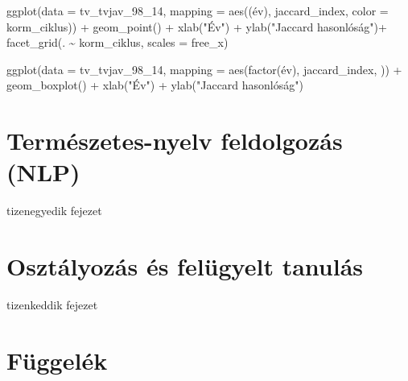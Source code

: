 \documentclass[
]{book}
\newenvironment{Shaded}{\begin{snugshade}}{\end{snugshade}}
\newcommand{\AttributeTok}[1]{\textcolor[rgb]{0.77,0.63,0.00}{#1}}
\newcommand{\FunctionTok}[1]{\textcolor[rgb]{0.00,0.00,0.00}{#1}}
\newcommand{\NormalTok}[1]{#1}
\newcommand{\SpecialCharTok}[1]{\textcolor[rgb]{0.00,0.00,0.00}{#1}}
\newcommand{\StringTok}[1]{\textcolor[rgb]{0.31,0.60,0.02}{#1}}
\begin{document}
\begin{Shaded}
\begin{Highlighting}[]
\FunctionTok{ggplot}\NormalTok{(}\AttributeTok{data =}\NormalTok{ tv\_tvjav\_98\_14, }\AttributeTok{mapping =} \FunctionTok{aes}\NormalTok{((év), jaccard\_index, }\AttributeTok{color =}\NormalTok{ korm\_ciklus)) }\SpecialCharTok{+}
  \FunctionTok{geom\_point}\NormalTok{() }\SpecialCharTok{+}
  \FunctionTok{xlab}\NormalTok{(}\StringTok{"Év"}\NormalTok{) }\SpecialCharTok{+}
  \FunctionTok{ylab}\NormalTok{(}\StringTok{"Jaccard hasonlóság"}\NormalTok{)}\SpecialCharTok{+}
  \FunctionTok{facet\_grid}\NormalTok{(. }\SpecialCharTok{\textasciitilde{}}\NormalTok{ korm\_ciklus, }\AttributeTok{scales =} \StringTok{\textquotesingle{}free\_x\textquotesingle{}}\NormalTok{)}
\end{Highlighting}
\end{Shaded}

\begin{Shaded}
\begin{Highlighting}[]
\FunctionTok{ggplot}\NormalTok{(}\AttributeTok{data =}\NormalTok{ tv\_tvjav\_98\_14, }\AttributeTok{mapping =} \FunctionTok{aes}\NormalTok{(}\FunctionTok{factor}\NormalTok{(év), jaccard\_index, )) }\SpecialCharTok{+}
  \FunctionTok{geom\_boxplot}\NormalTok{() }\SpecialCharTok{+}
  \FunctionTok{xlab}\NormalTok{(}\StringTok{"Év"}\NormalTok{) }\SpecialCharTok{+}
  \FunctionTok{ylab}\NormalTok{(}\StringTok{"Jaccard hasonlóság"}\NormalTok{)}
\end{Highlighting}
\end{Shaded}

\hypertarget{termuxe9szetes-nyelv-feldolgozuxe1s-nlp}{%
\chapter{Természetes-nyelv feldolgozás
(NLP)}\label{termuxe9szetes-nyelv-feldolgozuxe1s-nlp}}

tizenegyedik fejezet

\hypertarget{osztuxe1lyozuxe1s-uxe9s-feluxfcgyelt-tanuluxe1s}{%
\chapter{Osztályozás és felügyelt
tanulás}\label{osztuxe1lyozuxe1s-uxe9s-feluxfcgyelt-tanuluxe1s}}

tizenkeddik fejezet

\hypertarget{fuxfcggeluxe9k}{%
\chapter{Függelék}\label{fuxfcggeluxe9k}}
\end{document}
